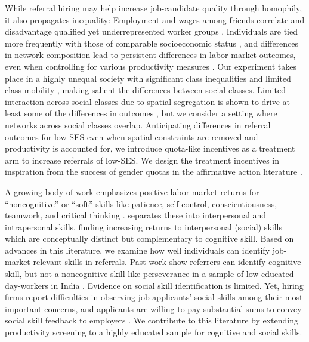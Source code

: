\documentclass[11pt,a4paper,oneside]{article}
\begin{document}
While referral hiring may help increase job-candidate quality through homophily, it also propagates inequality: Employment and wages among friends correlate \citep{calvo2004effects,calvo2007networks} and disadvantage qualified yet underrepresented worker groups \citep{bolte2020role,jackson2021inequality,beaman_job_2018}. Individuals are tied more frequently with those of comparable socioeconomic status \citep{chetty2022social_a}, and differences in network composition lead to persistent differences in labor market outcomes, even when controlling for various productivity measures \citep{stansbury2024class}. Our experiment takes place in a highly unequal society with significant class inequalities and limited class mobility \citep{angulo2012movilidad,garcia2015loteria}, making salient the differences between social classes. Limited interaction across social classes due to spatial segregation is shown to drive at least some of the differences in outcomes \citep{chetty2022social_b}, but we consider a setting where networks across social classes overlap. Anticipating differences in referral outcomes for low-SES even when spatial constraints are removed and productivity is accounted for, we introduce quota-like incentives as a treatment arm to increase referrals of low-SES. We design the treatment incentives in inspiration from the success of gender quotas in the affirmative action literature \citep{bertrand2019breaking, balafoutas2012affirmative, niederle2013costly}.

A growing body of work emphasizes positive labor market returns for ``noncognitive'' or ``soft'' skills like patience, self-control, conscientiousness, teamwork, and critical thinking \citep{heckman2006effects,lindqvist2011labor,heckman2012hard,weinberger2014increasing}. \citet{deming2017growing,deming2023multidimensional} separates these into interpersonal and intrapersonal skills, finding increasing returns to interpersonal (social) skills which are conceptually distinct but complementary to cognitive skill. Based on advances in this literature, we examine how well individuals can identify job-market relevant skills in referrals. Past work show referrers can identify cognitive skill, but not a noncognitive skill like perseverance in a sample of low-educated day-workers in India \citep{beaman_who_2012}. Evidence on social skill identification is limited. Yet, hiring firms report difficulties in observing job applicants' social skills among their most important concerns, and applicants are willing to pay substantial sums to convey social skill feedback to employers \citep{bassi2022screening}. We contribute to this literature by extending productivity screening to a highly educated sample for cognitive and social skills.
\end{document}
